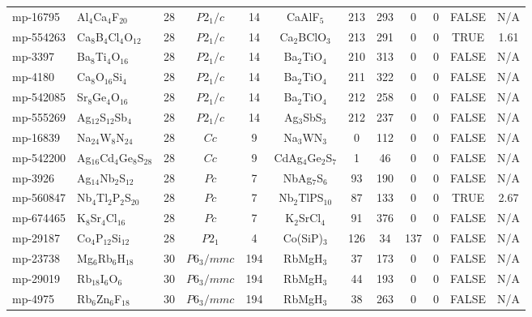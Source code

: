{\begin{longtable}{llcccccccccc}
    mp-16795 & Al$_{4}$Ca$_{4}$F$_{20}$ & 28    & $P2_1/c$ & 14    & CaAlF$_{5}$ & 213   & 293   & 0     & 0     & FALSE & N/A \\
    mp-554263 & Ca$_{8}$B$_{4}$Cl$_{4}$O$_{12}$ & 28    & $P2_1/c$ & 14    & Ca$_{2}$BClO$_{3}$ & 213   & 291   & 0     & 0     & TRUE  & 1.61  \\
    mp-3397 & Ba$_{8}$Ti$_{4}$O$_{16}$ & 28    & $P2_1/c$ & 14    & Ba$_{2}$TiO$_{4}$ & 210   & 313   & 0     & 0     & FALSE & N/A \\
    mp-4180 & Ca$_{8}$O$_{16}$Si$_{4}$ & 28    & $P2_1/c$ & 14    & Ba$_{2}$TiO$_{4}$ & 211   & 322   & 0     & 0     & FALSE & N/A \\
    mp-542085 & Sr$_{8}$Ge$_{4}$O$_{16}$ & 28    & $P2_1/c$ & 14    & Ba$_{2}$TiO$_{4}$ & 212   & 258   & 0     & 0     & FALSE & N/A \\
    mp-555269 & Ag$_{12}$S$_{12}$Sb$_{4}$ & 28    & $P2_1/c$ & 14    & Ag$_{3}$SbS$_{3}$ & 212   & 237   & 0     & 0     & FALSE & N/A \\
    mp-16839 & Na$_{24}$W$_{8}$N$_{24}$ & 28    & $Cc$  & 9     & Na$_{3}$WN$_{3}$ & 0     & 112   & 0     & 0     & FALSE & N/A \\
    mp-542200 & Ag$_{16}$Cd$_{4}$Ge$_{8}$S$_{28}$ & 28    & $Cc$  & 9     & CdAg$_{4}$Ge$_{2}$S$_{7}$ & 1     & 46    & 0     & 0     & FALSE & N/A \\
    mp-3926 & Ag$_{14}$Nb$_{2}$S$_{12}$ & 28    & $Pc$  & 7     & NbAg$_{7}$S$_{6}$ & 93    & 190   & 0     & 0     & FALSE & N/A \\
    mp-560847 & Nb$_{4}$Tl$_{2}$P$_{2}$S$_{20}$ & 28    & $Pc$  & 7     & Nb$_{2}$TlPS$_{10}$ & 87    & 133   & 0     & 0     & TRUE  & 2.67  \\
    mp-674465 & K$_{8}$Sr$_{4}$Cl$_{16}$ & 28    & $Pc$  & 7     & K$_{2}$SrCl$_{4}$ & 91    & 376   & 0     & 0     & FALSE & N/A \\
    mp-29187 & Co$_{4}$P$_{12}$Si$_{12}$ & 28    & $P2_1$ & 4     & Co(SiP)$_{3}$ & 126   & 34    & 137   & 0     & FALSE & N/A \\
    mp-23738 & Mg$_{6}$Rb$_{6}$H$_{18}$ & 30    & $P6_3/mmc$ & 194   & RbMgH$_{3}$ & 37    & 173   & 0     & 0     & FALSE & N/A \\
    mp-29019 & Rb$_{18}$I$_{6}$O$_{6}$ & 30    & $P6_3/mmc$ & 194   & RbMgH$_{3}$ & 44    & 193   & 0     & 0     & FALSE & N/A \\
    mp-4975 & Rb$_{6}$Zn$_{6}$F$_{18}$ & 30    & $P6_3/mmc$ & 194   & RbMgH$_{3}$ & 38    & 263   & 0     & 0     & FALSE & N/A \\

\end{longtable}}

